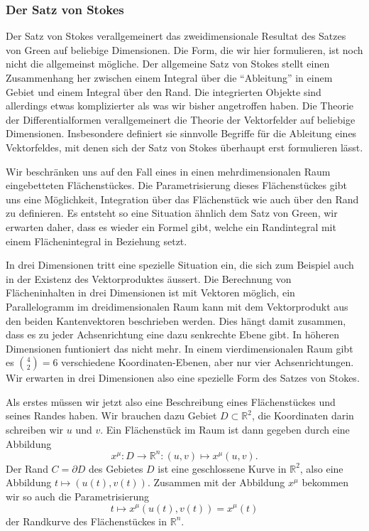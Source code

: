 \subsubsection{Der Satz von Stokes}
Der Satz von Stokes verallgemeinert das zweidimensionale Resultat des
Satzes von Green auf beliebige Dimensionen.
Die Form, die wir hier formulieren, ist noch nicht die allgemeinst
mögliche.
Der allgemeine Satz von Stokes stellt einen Zusammenhang her zwischen
einem Integral über die ``Ableitung'' in einem Gebiet und einem
Integral über den Rand.
Die integrierten Objekte sind allerdings etwas komplizierter als was
wir bisher angetroffen haben.
Die Theorie der Differentialformen verallgemeinert die Theorie der
Vektorfelder auf beliebige Dimensionen.
Insbesondere definiert sie sinnvolle Begriffe für die Ableitung eines
Vektorfeldes, mit denen sich der Satz von Stokes überhaupt erst formulieren
lässt.

Wir beschränken uns auf den Fall eines in einen mehrdimensionalen Raum
eingebetteten Flächen\-stückes.
Die Parametrisierung dieses Flächenstückes gibt uns eine Möglichkeit,
Integration über das Flächen\-stück wie auch über den Rand zu definieren.
Es entsteht so eine Situation ähnlich dem Satz von Green, wir erwarten
daher, dass es wieder ein Formel gibt, welche ein Randintegral mit einem
Flächenintegral in Beziehung setzt.

In drei Dimensionen tritt eine spezielle Situation ein, die sich zum
Beispiel auch in der Existenz des Vektorproduktes äussert.
Die Berechnung von Flächeninhalten in drei Dimensionen ist mit Vektoren
möglich, ein Parallelogramm im dreidimensionalen Raum kann mit dem
Vektorprodukt aus den beiden Kantenvektoren beschrieben werden.
Dies hängt damit zusammen, dass es zu jeder Achsenrichtung eine dazu
senkrechte Ebene gibt.
In höheren Dimensionen funtioniert das nicht mehr.
In einem vierdimensionalen Raum gibt es $\binom{4}{2}=6$ verschiedene
Koordinaten-Ebenen, aber nur vier Achsenrichtungen.
Wir erwarten in drei Dimensionen also eine spezielle Form des
Satzes von Stokes.

Als erstes müssen wir jetzt also eine Beschreibung eines Flächenstückes
und seines Randes haben.
Wir brauchen dazu Gebiet $D\subset\mathbb R^2$, die Koordinaten darin
schreiben wir $u$ und $v$.
Ein Flächenstück im Raum ist dann gegeben durch eine Abbildung
\[
x^\mu\colon D\to \mathbb R^n\colon (u,v)\mapsto x^\mu(u,v).
\]
Der Rand $C=\partial D$ des Gebietes $D$ ist eine geschlossene Kurve
in $\mathbb R^2$, also eine Abbildung $t\mapsto (u(t),v(t))$.
Zusammen mit der Abbildung $x^\mu$ bekommen wir so auch die Parametrisierung
\[
t\mapsto x^\mu(u(t),v(t)) = x^\mu(t)
\]
der Randkurve des Flächenstückes in $\mathbb R^n$.

